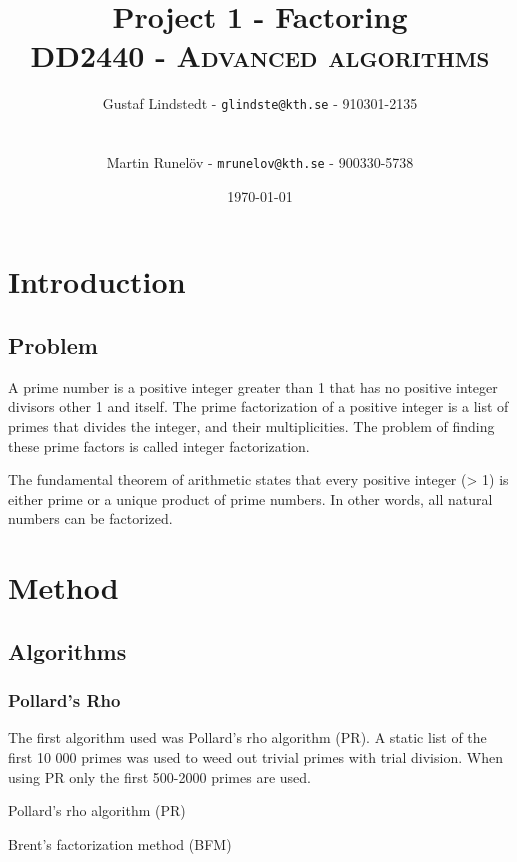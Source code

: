\documentclass[paper=a4, fontsize=11pt,numbers=endperiod]{scrartcl} %
\title{	
\huge Project 1 - Factoring \\ %
\vspace{10pt}
\normalfont \normalsize 
\textsc{DD2440 - Advanced algorithms } \\ [25pt] %
}
\author{\vspace{-20pt} Gustaf Lindstedt - \nolinkurl{glindste@kth.se} - 910301-2135\\\\\\Martin Runelöv - \nolinkurl{mrunelov@kth.se} - 900330-5738}
\date{\vspace{8pt}\normalsize\today} %
\numberwithin{equation}{section} %
\numberwithin{figure}{section} %
\numberwithin{table}{section} %
\begin{document}
\maketitle %


\section{Introduction}

\subsection{Problem}
A prime number is a positive integer greater than 1 that has no positive integer divisors other 1 and itself. The prime factorization of a positive integer is a list of primes that divides the integer, and their multiplicities. The problem of finding these prime factors is called integer factorization.

The fundamental theorem of arithmetic states that every positive integer (> 1) is either prime or a unique product of prime numbers. In other words, all natural numbers can be factorized.



\section{Method}
\subsection{Algorithms}
\subsubsection{Pollard's Rho}
The first algorithm used was Pollard's rho algorithm (PR). A static list of the first 10 000 primes was used to weed out trivial primes with trial division. When using PR only the first 500-2000 primes are used.

Pollard's rho algorithm (PR) \cite{pollard}

Brent's factorization method (BFM) \cite{brent} 
\end{document}
